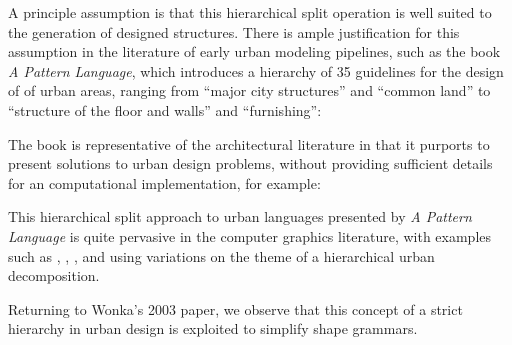 A principle assumption is that this hierarchical split operation is well suited to the generation of designed structures. There is ample justification for this assumption in the literature of early urban modeling pipelines, such as the book \emph{A Pattern Language}\cite{APL}, which introduces a hierarchy of 35 guidelines for the design of of urban areas, ranging from ``major city structures'' and ``common land'' to ``structure of the floor and walls'' and ``furnishing'':


The book is representative of the architectural literature in that it purports to present solutions to urban design problems, without providing sufficient details for an computational implementation, for example: 



This hierarchical split approach to urban languages presented by \emph{A Pattern Language} is quite pervasive in the computer graphics literature, with examples such as \cite{Finken08}, \cite{Hahn06}, \cite{Aliaga07},  and \cite{Parish01} using variations on the theme of a hierarchical urban decomposition.



Returning to Wonka's 2003 paper\cite{Wonka03}, we observe that this concept of a strict hierarchy in urban design is exploited to simplify shape grammars.

